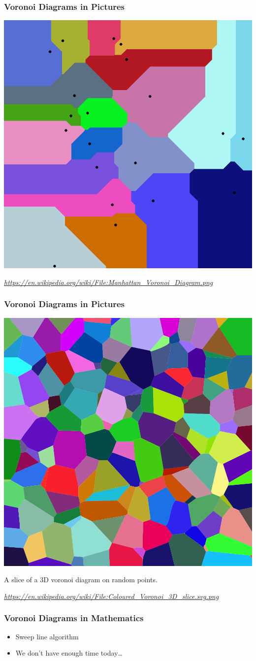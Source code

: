 \documentclass{beamer}
\newcommand\smallgray[1]{\textcolor{gray}{\small\it #1}}
\begin{document}
\begin{frame}
  \frametitle{Voronoi Diagrams in Pictures}

  \includegraphics[width=.6\textwidth]{Manhattan_Voronoi_Diagram.png}

  \smallgray{\url{https://en.wikipedia.org/wiki/File:Manhattan_Voronoi_Diagram.png}}
\end{frame}

\begin{frame}
  \frametitle{Voronoi Diagrams in Pictures}

  \includegraphics[width=.6\textwidth]{Coloured_Voronoi_3D_slice.png}

  A slice of a 3D voronoi diagram on random points.

  \smallgray{\url{https://en.wikipedia.org/wiki/File:Coloured_Voronoi_3D_slice.svg.png}}
\end{frame}

\begin{frame}
  \frametitle{Voronoi Diagrams in Mathematics}

  \begin{itemize}
  \item Sweep line algorithm
  \item We don't have enough time today\dots
  \end{itemize}
\end{frame}
\end{document}
